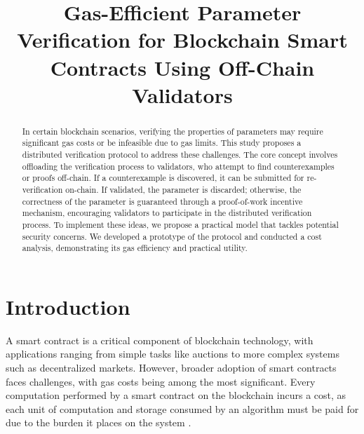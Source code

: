 \documentclass[runningheads]{llncs}
\begin{document}
%
\title{Gas-Efficient Parameter Verification for Blockchain Smart Contracts Using Off-Chain Validators}
%
%
%
%
%
\maketitle              %
%
\begin{abstract}
In certain blockchain scenarios, verifying the properties of parameters may require significant gas costs or be infeasible due to gas limits. This study proposes a distributed verification protocol to address these challenges. The core concept involves offloading the verification process to validators, who attempt to find counterexamples or proofs off-chain. If a counterexample is discovered, it can be submitted for re-verification on-chain. If validated, the parameter is discarded; otherwise, the correctness of the parameter is guaranteed through a proof-of-work incentive mechanism, encouraging validators to participate in the distributed verification process. To implement these ideas, we propose a practical model that tackles potential security concerns. We developed a prototype of the protocol and conducted a cost analysis, demonstrating its gas efficiency and practical utility.
\end{abstract}
%
%
%
\section{Introduction}
\label{sec:introduction}
\lstset{language=solidity}
A smart contract \cite{szabo1997smartcontracts,eth-whitepaper,tezos-whitepaper} is a critical component of blockchain technology, with applications ranging from simple tasks like auctions to more complex systems such as decentralized markets. However, broader adoption of smart contracts faces challenges, with gas costs being among the most significant. Every computation performed by a smart contract on the blockchain incurs a cost, as each unit of computation and storage consumed by an algorithm must be paid for due to the burden it places on the system \cite{eth-whitepaper,eth-yellowpaper,gas-cost}.
\end{document}

